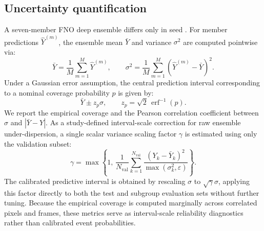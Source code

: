 \subsection{Uncertainty quantification}
\label{subsec:uncertainty}
A seven-member FNO deep ensemble differs only in seed \citep{lakshminarayanan2017deepensembles}. For member predictions $\widehat{Y} ^ {(m)}$, the ensemble mean $\bar{Y}$ and variance $\sigma^2$ are computed pointwise via:
\begin{equation}
\bar{Y} = \frac{1}{M}\sum_{m = 1} ^ {M}\widehat{Y} ^ {(m)},
\qquad
\sigma ^ 2 = \frac{1}{M}\sum_{m = 1} ^ {M}\left(\widehat{Y} ^ {(m)} - \bar{Y}\right) ^ 2.
\end{equation}
Under a Gaussian error assumption, the central prediction interval corresponding to a nominal coverage probability $p$ is given by:
\begin{equation}
\bar{Y}\pm z_p\sigma,
\qquad
z_p = \sqrt{2}\, \operatorname{erf} ^ {-1}(p).
\end{equation}
We report the empirical coverage and the Pearson correlation coefficient between $\sigma$ and $|\bar{Y} - Y|$. As a study-defined interval-scale correction for raw ensemble under-dispersion, a single scalar variance scaling factor $\gamma$ is estimated using only the validation subset:
\begin{equation}
\gamma = \max\left\{1,\, \frac{1}{N_{\mathrm{val}}} \sum_{k=1}^{N_{\mathrm{val}}} \frac{(Y_k - \bar{Y}_k)^2}{\max(\sigma_k^2, \varepsilon)}\right\}.
\end{equation}
The calibrated predictive interval is obtained by rescaling $\sigma$ to $\sqrt{\gamma}\sigma$, applying this factor directly to both the test and subgroup evaluation sets without further tuning. Because the empirical coverage is computed marginally across correlated pixels and frames, these metrics serve as interval-scale reliability diagnostics rather than calibrated event probabilities.

